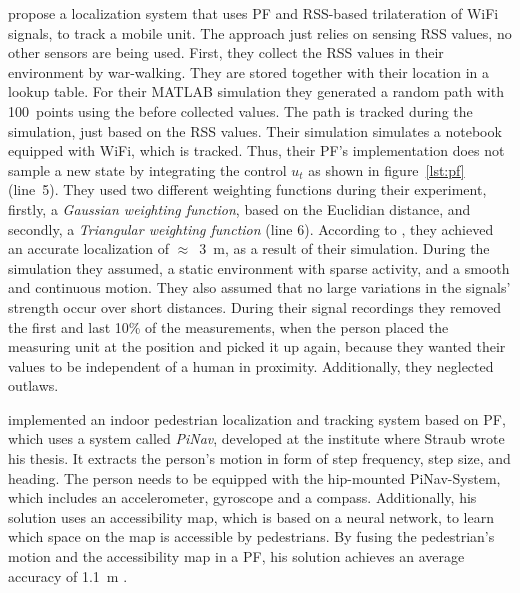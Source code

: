 \citet{Siddiqui:tracking} propose a localization system that uses \acs{PF} and \acs{RSS}-based trilateration of WiFi signals, to track a mobile unit. The approach just relies on sensing \acs{RSS} values, no other sensors are being used. First, they collect the \acs{RSS} values in their environment by war-walking. They are stored together with their location in a lookup table. For their MATLAB simulation they generated a random path with 100~points using the before collected values. The path is tracked during the simulation, just based on the \acs{RSS} values. Their simulation simulates a notebook equipped with WiFi, which is tracked. Thus, their \acs{PF}'s implementation does not sample a new state by integrating the control $u_t$ as shown in figure~\ref{lst:pf} (line~5). They used two different weighting functions during their experiment, firstly, a \emph{Gaussian weighting function}, based on the Euclidian distance, and secondly, a \emph{Triangular weighting function} (line 6). According to \citet{Siddiqui:tracking}, they achieved an accurate localization of $\approx$~3~m, as a result of their simulation. During the simulation they assumed, a static environment with sparse activity, and a smooth and continuous motion. They also assumed that no large variations in the signals' strength occur over short distances. During their signal recordings they removed the first and last 10\% of the measurements, when the person placed the measuring unit at the position and picked it up again, because they wanted their values to be independent of a human in proximity. Additionally, they neglected outlaws.

\citet{straub:pf} implemented an indoor pedestrian localization and tracking system based on \acs{PF}, which uses a system called \emph{PiNav}, developed at the institute where Straub wrote his thesis. It extracts the person's motion in form of step frequency, step size, and heading. The person needs to be equipped with the hip-mounted PiNav-System, which includes an accelerometer, gyroscope and a compass. Additionally, his solution uses an accessibility map, which is based on a neural network, to learn which space on the map is accessible by pedestrians. By fusing the pedestrian's motion and the accessibility map in a \acs{PF}, his solution achieves an average accuracy of 1.1~m \citep{straub:pf}.


